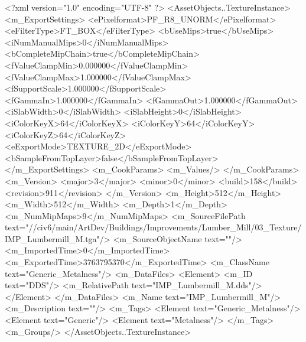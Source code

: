 <?xml version="1.0" encoding="UTF-8" ?>
<AssetObjects..TextureInstance>
	<m_ExportSettings>
		<ePixelformat>PF_R8_UNORM</ePixelformat>
		<eFilterType>FT_BOX</eFilterType>
		<bUseMips>true</bUseMips>
		<iNumManualMips>0</iNumManualMips>
		<bCompleteMipChain>true</bCompleteMipChain>
		<fValueClampMin>0.000000</fValueClampMin>
		<fValueClampMax>1.000000</fValueClampMax>
		<fSupportScale>1.000000</fSupportScale>
		<fGammaIn>1.000000</fGammaIn>
		<fGammaOut>1.000000</fGammaOut>
		<iSlabWidth>0</iSlabWidth>
		<iSlabHeight>0</iSlabHeight>
		<iColorKeyX>64</iColorKeyX>
		<iColorKeyY>64</iColorKeyY>
		<iColorKeyZ>64</iColorKeyZ>
		<eExportMode>TEXTURE_2D</eExportMode>
		<bSampleFromTopLayer>false</bSampleFromTopLayer>
	</m_ExportSettings>
	<m_CookParams>
		<m_Values/>
	</m_CookParams>
	<m_Version>
		<major>3</major>
		<minor>0</minor>
		<build>158</build>
		<revision>911</revision>
	</m_Version>
	<m_Height>512</m_Height>
	<m_Width>512</m_Width>
	<m_Depth>1</m_Depth>
	<m_NumMipMaps>9</m_NumMipMaps>
	<m_SourceFilePath text="//civ6/main/ArtDev/Buildings/Improvements/Lumber_Mill/03_Texture/IMP_Lumbermill_M.tga"/>
	<m_SourceObjectName text=""/>
	<m_ImportedTime>0</m_ImportedTime>
	<m_ExportedTime>3763795370</m_ExportedTime>
	<m_ClassName text="Generic_Metalness"/>
	<m_DataFiles>
		<Element>
			<m_ID text="DDS"/>
			<m_RelativePath text="IMP_Lumbermill_M.dds"/>
		</Element>
	</m_DataFiles>
	<m_Name text="IMP_Lumbermill_M"/>
	<m_Description text=""/>
	<m_Tags>
		<Element text="Generic_Metalness"/>
		<Element text="Generic"/>
		<Element text="Metalness"/>
	</m_Tags>
	<m_Groups/>
</AssetObjects..TextureInstance>

